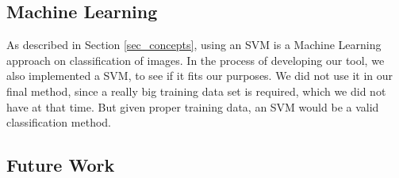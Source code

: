 \subsection{Machine Learning}
As described in Section \ref{sec_concepts}, using an SVM is a Machine Learning approach on classification of images.
In the process of developing our tool, we also implemented a SVM, to see if it fits our purposes.
We did not use it in our final method, since a really big training data set is required, which we did not have at that time.
But given proper training data, an SVM would be a valid classification method.

\subsection{Future Work}


